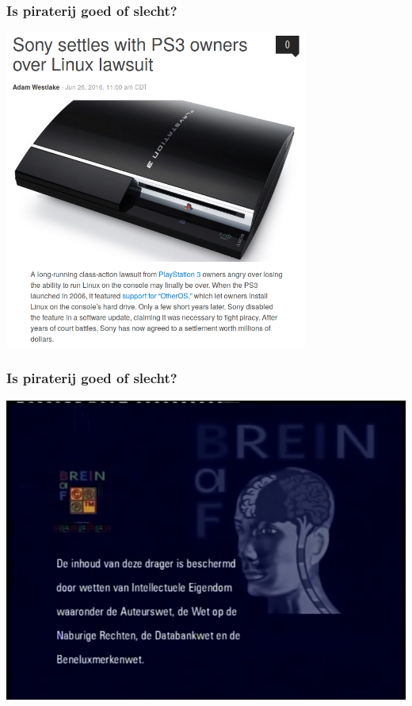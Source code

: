 \documentclass{beamer}
\begin{document}
\begin{frame}
	\frametitle{Is piraterij goed of slecht?}

	\begin{center}
	\includegraphics[width=0.75\textwidth]{ps3linux.png}
	\end{center}
\end{frame}

\begin{frame}
	\frametitle{Is piraterij goed of slecht?}

	\begin{center}
	\includegraphics[width=\textwidth]{brein.png}
	\end{center}
\end{frame}
\end{document}
